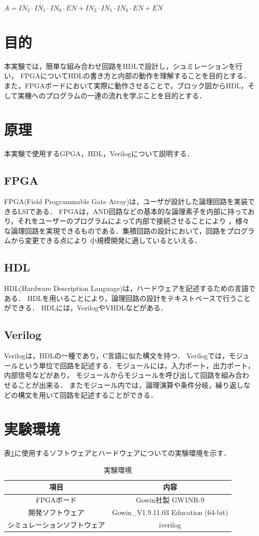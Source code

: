 \documentclass[a4paper,11pt]{ltjsarticle}
\begin{document}
$A=\overline{IN_2}\cdot\overline{IN_1} \cdot IN_0 \cdot EN + IN_2 \cdot \overline{IN_1} \cdot \overline{IN_0} \cdot EN + \overline{EN}$
\section{目的}
本実験では，簡単な組み合わせ回路をHDLで設計し，シュミレーションを行い，
FPGAについてHDLの書き方と内部の動作を理解することを目的とする．
また，FPGAボードにおいて実際に動作させることで，ブロック図からHDL，そして実機へのプログラムの一連の流れを学ぶことを目的とする．
\section{原理}
本実験で使用するGPGA，HDL，Verilogについて説明する．
\subsection{FPGA}
FPGA(Field Programmable Gate Array)は，ユーザが設計した論理回路を実装できるLSIである．
FPGAは，AND回路などの基本的な論理素子を内部に持っており，それをユーザーのプログラムによって内部で接続させることにより
，様々な論理回路を実現できるものである．集積回路の設計において，回路をプログラムから変更できる点により
小規模開発に適しているといえる．
\subsection{HDL}
HDL(Hardware Description Language)は，ハードウェアを記述するための言語である．
HDLを用いることにより，論理回路の設計をテキストベースで行うことができる．
HDLには，VerilogやVHDLなどがある．
\subsection{Verilog}
Verilogは，HDLの一種であり，C言語に似た構文を持つ．
Verilogでは，モジュールという単位で回路を記述する．モジュールには，入力ポート，出力ポート，内部信号などがあり，
モジュールからモジュールを呼び出して回路を組み合わせることが出来る．
またモジュール内では，論理演算や条件分岐，繰り返しなどの構文を用いて回路を記述することができる．
\section{実験環境}
表\ref{tab:zikken}に使用するソフトウェアとハードウェアについての実験環境を示す．
\begin{table}[H]
  \centering
  \caption{実験環境}
  \label{tab:zikken}
  \begin{tabular}{|c|c|}
    \hline
    項目             & 内容                                   \\
    \hline
    FPGAボード        & Gowin社製 GW1NR-9                      \\
    \hline
    開発ソフトウェア       & Gowin\_V1.9.11.03 Education (64-bit) \\
    \hline
    シミュレーションソフトウェア & iverilog                             \\
    \hline
  \end{tabular}
\end{table}
\end{document}
